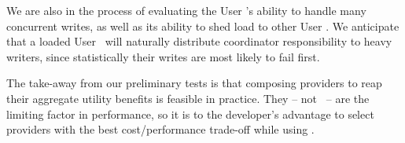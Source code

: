 We are also in the process of evaluating the User \SG's ability to handle many concurrent
writes, as well as its ability to shed load to other User \SGs.
We anticipate that a loaded User \SG\ will naturally distribute coordinator responsibility to
heavy writers, since statistically their writes are most likely to fail first.

The take-away from our preliminary tests is that composing providers to reap their aggregate utility benefits is feasible 
in practice. They -- not \Syndicate\ -- are the limiting factor in performance, so it is to the developer's
advantage to select providers with the best cost/performance trade-off while using \Syndicate.